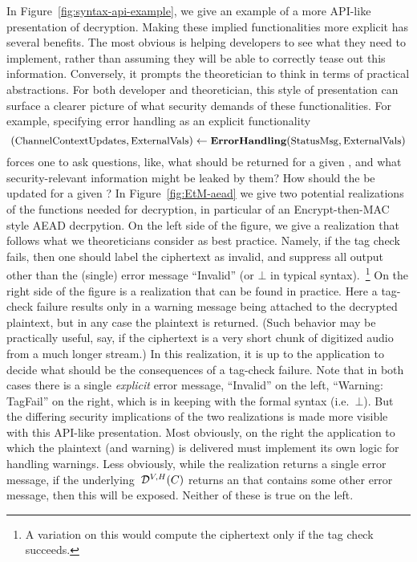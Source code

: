 In Figure~\ref{fig:syntax-api-example}, we give an example of a more
API-like presentation of decryption.
%
Making these implied functionalities more explicit has several benefits.  The
most obvious is helping developers to see what they need to implement, rather
than assuming they will be able to correctly tease out this information.
Conversely, it prompts the theoretician to think in terms of practical
abstractions.
%
For both developer and theoretician, this style of presentation can surface a
clearer picture of what security demands of these functionalities. For example,
specifying error handling as an explicit functionality
\[
(\varfont{ChannelContextUpdates}, \varfont{ExternalVals}) \gets
                                  \algfont{ErrorHandling}(%
                                  \varfont{StatusMsg}, \varfont{ExternalVals})
\]
forces one to ask questions, like, what  should
be returned for a given , and what
security-relevant information might be leaked by them?  How should the
 be updated for a given ?
%
In Figure~\ref{fig:EtM-aead} we give two potential realizations of the
functions needed for decryption, in particular of an Encrypt-then-MAC
style AEAD decrpytion.  On the left side of the figure, we
give a realization that follows what we theoreticians consider as best
practice.  Namely, if the tag check fails, then one should label the
ciphertext as invalid, and suppress all output other than the (single)
error message ``Invalid'' (or $\bot$ in typical syntax).~\footnote{A
  variation on this would compute the ciphertext only if the tag check
succeeds.}
%
On the right side of the figure is a realization that can be found in
practice.  Here a tag-check failure results only in a warning message
being attached to the decrypted plaintext, but in any case the
plaintext is returned.  (Such behavior may be practically useful, say,
if the ciphertext is a very short chunk of digitized audio from a much
longer stream.)  In this realization, it is up to the application to
decide what should be the consequences of a tag-check failure. Note
that in both cases there is a single \emph{explicit} error message,
``Invalid'' on the left, ``Warning: TagFail'' on the right,
which is in keeping with the formal syntax (i.e.\ $\bot$).  But the
differing security implications of the two realizations is made more
visible with this API-like presentation.  Most obviously, on the right
the application to which the plaintext (and warning) is delivered must
implement its own logic for handling warnings.  Less obviously, while
the realization returns a single error message, if the
underlying~$\mathcal{D}^{V,H}(C)$ returns an  that
contains some other error message, then this will be exposed.  Neither
of these is true on the left.

